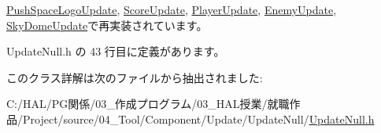 \mbox{\hyperlink{class_push_space_logo_update_aa07fe6f6f4f072e1f81bc6708dd4727e}{Push\+Space\+Logo\+Update}}, \mbox{\hyperlink{class_score_update_aae2b398784079a651ed92eb4c634b1c9}{Score\+Update}}, \mbox{\hyperlink{class_player_update_af6e1b8ca60399f232e64d2acb4968c75}{Player\+Update}}, \mbox{\hyperlink{class_enemy_update_ae9662f3a2d064dc69c0d68293e60f051}{Enemy\+Update}}, \mbox{\hyperlink{class_sky_dome_update_ae163cb90e4de561fe1f7b2cb311be331}{Sky\+Dome\+Update}}で再実装されています。



 Update\+Null.\+h の 43 行目に定義があります。



このクラス詳解は次のファイルから抽出されました\+:\begin{DoxyCompactItemize}
\item 
C\+:/\+H\+A\+L/\+P\+G関係/03\+\_\+作成プログラム/03\+\_\+\+H\+A\+L授業/就職作品/\+Project/source/04\+\_\+\+Tool/\+Component/\+Update/\+Update\+Null/\mbox{\hyperlink{_update_null_8h}{Update\+Null.\+h}}\end{DoxyCompactItemize}
